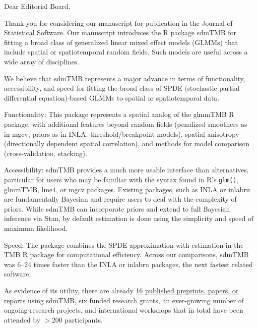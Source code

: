 \documentclass[letterpaper]{letter}
\providecommand{\pkg}[1]{{\normalfont\fontseries{b}\selectfont #1}}
\let\proglang=\textsf
\begin{document}
\begin{letter}{}
\pagestyle{empty}

\opening{Dear Editorial Board,}

Thank you for considering our manuscript for publication in the Journal of Statistical Software. Our manuscript introduces the \proglang{R} package \pkg{sdmTMB} for fitting a broad class of generalized linear mixed effect models (GLMMs) that include spatial or spatiotemporal random fields. Such models are useful across a wide array of disciplines.

We believe that \pkg{sdmTMB} represents a major advance in terms of functionality, accessibility, and speed for fitting the broad class of SPDE (stochastic partial differential equation)-based GLMMs to spatial or spatiotemporal data.

Functionality: This package represents a spatial analog of the \pkg{glmmTMB} \proglang{R} package, with additional features beyond random fields (penalized smoothers as in \pkg{mgcv}, priors as in \pkg{INLA}, threshold/breakpoint models), spatial anisotropy (directionally dependent spatial correlation), and methods for model comparison (cross-validation, stacking). 

Accessibility: \pkg{sdmTMB} provides a much more usable interface than alternatives, particular for users who may be familiar with the syntax found in \proglang{R}'s \texttt{glm()}, \pkg{glmmTMB}, \pkg{lme4}, or \pkg{mgcv} packages. Existing packages, such as \pkg{INLA} or \pkg{inlabru} are fundamentally Bayesian and require users to deal with the complexity of priors. While \pkg{sdmTMB} can incorporate priors and extend to full Bayesian inference via \pkg{Stan}, by default estimation is done using the simplicity and speed of maximum likelihood.

Speed: The package combines the SPDE approximation with estimation in the \pkg{TMB} \proglang{R} package for computational efficiency. Across our comparisons, \pkg{sdmTMB} was 6--24 times faster than the \pkg{INLA} or \pkg{inlabru} packages, the next fastest related software.

As evidence of its utility, there are already \href{https://github.com/pbs-assess/sdmTMB/wiki/Publications-using-sdmTMB}{16 published preprints, papers, or reports} using \pkg{sdmTMB}, six funded research grants, an ever-growing number of ongoing research projects, and international workshops that in total have been attended by $>$200 participants.



\end{letter}
\end{document}
